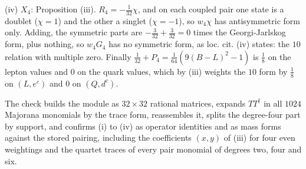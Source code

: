 (iv) $X_{4}$: Proposition (iii). $R_{4} = -\tfrac{1}{32}\chi$, and on each coupled pair one state is a doublet ($\chi = 1$) and the other a singlet ($\chi = -1$), so $w_{4}\chi$ has antisymmetric form only. Adding, the symmetric parts are $-\tfrac{3}{32} + \tfrac{3}{32} = 0$ times the Georgi-Jarlskog form, plus nothing, so $w_{4}G_{4}$ has no symmetric form, as loc. cit. (iv) states: the $10$ relation with multiple zero. Finally $\tfrac{1}{32} + P_{4} = \tfrac{1}{64}(9(B - L)^{2} - 1)$ is $\tfrac18$ on the lepton values and $0$ on the quark values, which by (iii) weights the $10$ form by $\tfrac18$ on $(L, e^{c})$ and $0$ on $(Q, d^{c})$.

The check builds the module as $32 \times 32$ rational matrices, expands $TT^{\dagger}$ in all $1024$ Majorana monomials by the trace form, reassembles it, splits the degree-four part by support, and confirms (i) to (iv) as operator identities and as mass forms against the stored pairing, including the coefficients $(x, y)$ of (iii) for four even weightings and the quartet traces of every pair monomial of degrees two, four and six.
